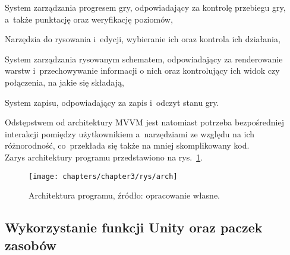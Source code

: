 \begin{citemize}
    \item System zarządzania progresem gry, odpowiadający za kontrolę przebiegu gry,
    a~także punktację oraz weryfikację poziomów,
    \item Narzędzia do rysowania i~edycji, wybieranie ich oraz kontrola ich działania,
    \item System zarządzania rysowanym schematem,
    odpowiadający za renderowanie warstw i~przechowywanie informacji o nich
    oraz kontrolujący ich widok czy połączenia, na jakie się składają,
    \item System zapisu, odpowiadający za zapis i~odczyt stanu gry.
\end{citemize}

Odstępstwem od architektury MVVM jest natomiast potrzeba bezpośredniej interakcji pomiędzy użytkownikiem
a~narzędziami ze względu na ich różnorodność, co~przekłada się także na mniej skomplikowany kod.\\
Zarys architektury programu przedstawiono na rys.~\ref{fig:architektura}.

\begin{figure}[h!]
    \centering
    \texttt{[image: chapters/chapter3/rys/arch]}
    \caption[Architektura programu.]{Architektura programu, źródło: opracowanie własne.}
    \label{fig:architektura}
\end{figure}

\subsection{Wykorzystanie funkcji Unity oraz paczek zasobów}
\label{subsec:zasoby}

